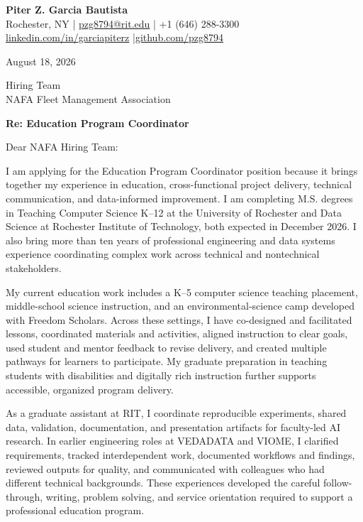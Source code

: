 \documentclass[11pt,letterpaper]{article}
\begin{document}
\textbf{\Large Piter Z. Garcia Bautista}\\
Rochester, NY \enspace|\enspace
\href{mailto:pzg8794@rit.edu}{pzg8794@rit.edu} \enspace|\enspace
+1 (646) 288-3300\\
\href{https://linkedin.com/in/garciapiterz}{linkedin.com/in/garciapiterz}
\enspace|\enspace \href{https://github.com/pzg8794}{github.com/pzg8794}

\vspace{10pt}
August 18, 2026

Hiring Team\\
NAFA Fleet Management Association

\textbf{Re: Education Program Coordinator}

Dear NAFA Hiring Team:

I am applying for the Education Program Coordinator position because it brings
together my experience in education, cross-functional project delivery,
technical communication, and data-informed improvement. I am completing M.S.
degrees in Teaching Computer Science K--12 at the University of Rochester and
Data Science at Rochester Institute of Technology, both expected in December
2026. I also bring more than ten years of professional engineering and data
systems experience coordinating complex work across technical and
nontechnical stakeholders.

My current education work includes a K--5 computer science teaching placement,
middle-school science instruction, and an environmental-science camp developed
with Freedom Scholars. Across these settings, I have co-designed and
facilitated lessons, coordinated materials and activities, aligned instruction
to clear goals, used student and mentor feedback to revise delivery, and
created multiple pathways for learners to participate. My graduate preparation
in teaching students with disabilities and digitally rich instruction further
supports accessible, organized program delivery.

As a graduate assistant at RIT, I coordinate reproducible experiments, shared
data, validation, documentation, and presentation artifacts for faculty-led AI
research. In earlier engineering roles at VEDADATA and VIOME, I clarified
requirements, tracked interdependent work, documented workflows and findings,
reviewed outputs for quality, and communicated with colleagues who had
different technical backgrounds. These experiences developed the careful
follow-through, writing, problem solving, and service orientation required to
support a professional education program.
\end{document}
